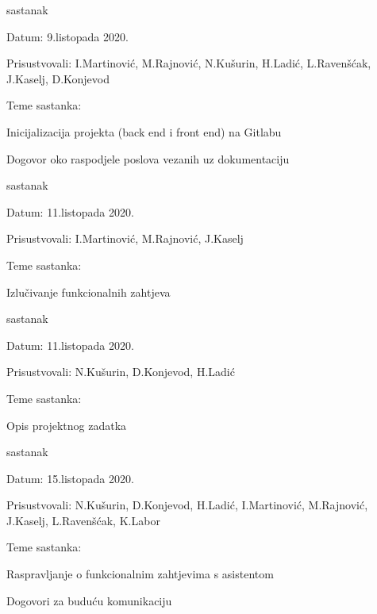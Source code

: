 \begin{packed_enum}
			\item  sastanak
			\item[] \begin{packed_item}
				\item Datum:  9.listopada 2020.
				\item Prisustvovali: I.Martinović, M.Rajnović, N.Kušurin, H.Ladić, L.Ravenšćak, J.Kaselj, D.Konjevod
				\item Teme sastanka:
				\begin{packed_item}
					\item   Inicijalizacija projekta (back end i front end) na Gitlabu
					\item   Dogovor oko raspodjele poslova vezanih uz dokumentaciju
				\end{packed_item}
			\end{packed_item}
	
			\item sastanak
			\item[] \begin{packed_item}
				\item Datum: 11.listopada 2020.
				\item Prisustvovali: I.Martinović, M.Rajnović, J.Kaselj
				\item Teme sastanka:
				\begin{packed_item}
					\item   Izlučivanje funkcionalnih zahtjeva
				\end{packed_item}
			\end{packed_item}
		
			\item sastanak
			\item[] \begin{packed_item}
				\item Datum: 11.listopada 2020.
				\item Prisustvovali: N.Kušurin, D.Konjevod, H.Ladić
				\item Teme sastanka:
				\begin{packed_item}
					\item   Opis projektnog zadatka
				\end{packed_item}
			\end{packed_item}
		
		\item sastanak
		\item[] \begin{packed_item}
			\item Datum:  15.listopada 2020.
			\item Prisustvovali: N.Kušurin, D.Konjevod, H.Ladić, I.Martinović, M.Rajnović, J.Kaselj, L.Ravenšćak,  K.Labor
			\item Teme sastanka: 
			\begin{packed_item}
				\item   Raspravljanje o funkcionalnim zahtjevima s asistentom
				\item 	Dogovori za buduću komunikaciju
			\end{packed_item}
		\end{packed_item}
	

\end{packed_enum}
